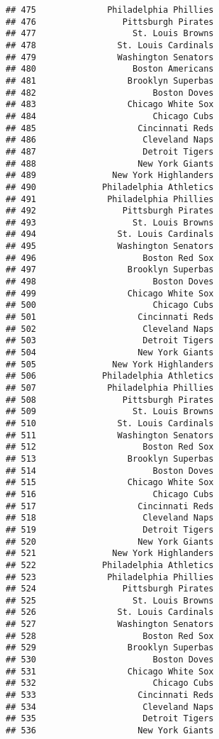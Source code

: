 \documentclass[]{article}
\begin{document}
\begin{verbatim}
## 475              Philadelphia Phillies
## 476                 Pittsburgh Pirates
## 477                   St. Louis Browns
## 478                St. Louis Cardinals
## 479                Washington Senators
## 480                   Boston Americans
## 481                  Brooklyn Superbas
## 482                       Boston Doves
## 483                  Chicago White Sox
## 484                       Chicago Cubs
## 485                    Cincinnati Reds
## 486                     Cleveland Naps
## 487                     Detroit Tigers
## 488                    New York Giants
## 489               New York Highlanders
## 490             Philadelphia Athletics
## 491              Philadelphia Phillies
## 492                 Pittsburgh Pirates
## 493                   St. Louis Browns
## 494                St. Louis Cardinals
## 495                Washington Senators
## 496                     Boston Red Sox
## 497                  Brooklyn Superbas
## 498                       Boston Doves
## 499                  Chicago White Sox
## 500                       Chicago Cubs
## 501                    Cincinnati Reds
## 502                     Cleveland Naps
## 503                     Detroit Tigers
## 504                    New York Giants
## 505               New York Highlanders
## 506             Philadelphia Athletics
## 507              Philadelphia Phillies
## 508                 Pittsburgh Pirates
## 509                   St. Louis Browns
## 510                St. Louis Cardinals
## 511                Washington Senators
## 512                     Boston Red Sox
## 513                  Brooklyn Superbas
## 514                       Boston Doves
## 515                  Chicago White Sox
## 516                       Chicago Cubs
## 517                    Cincinnati Reds
## 518                     Cleveland Naps
## 519                     Detroit Tigers
## 520                    New York Giants
## 521               New York Highlanders
## 522             Philadelphia Athletics
## 523              Philadelphia Phillies
## 524                 Pittsburgh Pirates
## 525                   St. Louis Browns
## 526                St. Louis Cardinals
## 527                Washington Senators
## 528                     Boston Red Sox
## 529                  Brooklyn Superbas
## 530                       Boston Doves
## 531                  Chicago White Sox
## 532                       Chicago Cubs
## 533                    Cincinnati Reds
## 534                     Cleveland Naps
## 535                     Detroit Tigers
## 536                    New York Giants

\end{verbatim}
\end{document}
